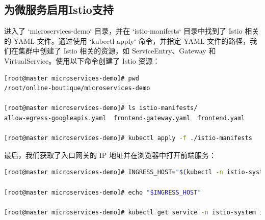 \subsection{为微服务启用Istio支持}
进入了 `microservices-demo` 目录，并在 `istio-manifests` 目录中找到了 Istio 相关的 YAML 文件。通过使用 `kubectl apply` 命令，并指定 YAML 文件的路径，我们在集群中创建了 Istio 相关的资源，如 ServiceEntry、Gateway 和 VirtualService。使用以下命令创建了 Istio 资源：
\begin{lstlisting}[language=bash]
[root@master microservices-demo]# pwd
/root/online-boutique/microservices-demo

[root@master microservices-demo]# ls istio-manifests/
allow-egress-googleapis.yaml  frontend-gateway.yaml  frontend.yaml

[root@master microservices-demo]# kubectl apply -f ./istio-manifests
\end{lstlisting}
最后，我们获取了入口网关的 IP 地址并在浏览器中打开前端服务：
\begin{lstlisting}[language=bash]
[root@master microservices-demo]# INGRESS_HOST="$(kubectl -n istio-system get service istio-ingressgateway -o jsonpath='{.status.loadBalancer.ingress[0].ip}')"

[root@master microservices-demo]# echo "$INGRESS_HOST"

[root@master microservices-demo]# kubectl get service -n istio-system istio-ingressgateway -o wide
\end{lstlisting}

